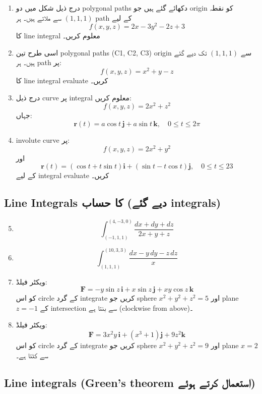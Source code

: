 \begin{enumerate}
\begin{enumerate}
\item درج ذیل شکل میں دو polygonal paths دکھائے گئے ہیں جو origin کو نقطہ \( (1,1,1) \) سے ملاتے ہیں۔ ہر path کے لیے
\[
f(x,y,z) = 2x - 3y^2 - 2z + 3
\]
کا line integral معلوم کریں۔

\item اسی طرح تین polygonal paths (C1, C2, C3) origin سے \( (1,1,1) \) تک دیے گئے ہیں۔ ہر path پر:
\[
f(x,y,z) = x^2 + y - z
\]
کا line integral evaluate کریں۔

\item درج ذیل curve پر integral معلوم کریں:
\[
f(x,y,z) = 2x^2 + z^2
\]
جہاں:
\[
\mathbf{r}(t) = a\cos t\,\mathbf{j} + a\sin t\,\mathbf{k}, \quad 0 \le t \le 2\pi
\]

\item involute curve پر:
\[
f(x,y,z) = 2x^2 + y^2
\]
اور
\[
\mathbf{r}(t) = (\cos t + t\sin t)\mathbf{i} + (\sin t - t\cos t)\mathbf{j}, \quad 0 \le t \le 23
\]
کے لیے integral evaluate کریں۔

\end{enumerate}

\subsection*{Line Integrals کا حساب (دیے گئے integrals)}

\begin{enumerate}
\setcounter{enumi}{4}

\item
\[
\int_{(-1,1,1)}^{(4,-3,0)} \frac{dx + dy + dz}{2x + y + z}
\]

\item
\[
\int_{(1,1,1)}^{(10,3,3)} \frac{dx - y\,dy - z\,dz}{x}
\]

\item ویکٹر فیلڈ:
\[
\mathbf{F} = -y\sin z\,\mathbf{i} + x\sin z\,\mathbf{j} + xy\cos z\,\mathbf{k}
\]
کو اس circle کے گرد integrate کریں جو sphere \( x^2+y^2+z^2=5 \) اور plane \( z=-1 \) کے intersection سے بنتا ہے (clockwise from above)۔

\item ویکٹر فیلڈ:
\[
\mathbf{F} = 3x^2y\,\mathbf{i} + (x^3+1)\mathbf{j} + 9z^2\mathbf{k}
\]
کو اس circle کے گرد integrate کریں جو sphere \( x^2+y^2+z^2=9 \) اور plane \( x=2 \) سے کٹتا ہے۔

\end{enumerate}

\subsection*{Line integrals (Green’s theorem استعمال کرتے ہوئے)}


\end{enumerate}
